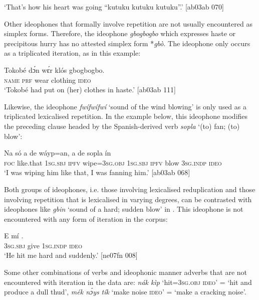 \glt ‘That’s how his heart was going “kutuku kutuku kutuku”.’ [ab03ab 070]
\z

Other ideophones that formally involve repetition are not usually encountered as simplex forms. Therefore, the ideophone \textit{gbogbogbo} which expresses haste or precipitous hurry has no attested simplex form *\textit{gbò}. The ideophone only occurs as a triplicated iteration, as in this example: 


\ea%
    \label{ex:key:1620}
    \gll Tokobé  dɔ́n  wɛ́r    klós    gbogbogbo.\\
\textsc{name}  \textsc{prf}  wear  clothing  \textsc{ideo}\\

\glt ‘Tokobé had put on (her) clothes in haste.’ [ab03ab 111]
\z

Likewise, the ideophone \textit{fwífwífwí} ‘sound of the wind blowing’ is only used as a triplicated lexicalised repetition. In the example below, this ideophone modifies the preceding clause headed by the Spanish-derived verb \textit{sopla} ‘(to) fan; (to) blow’:


\ea%
    \label{ex:key:1621}
    \gll Na  só    a    de  wáyp=an,  a    de  sopla  ín    \\
\textsc{foc}  like.that  \textsc{1sg.sbj}  \textsc{ipfv}  wipe=\textsc{3sg.obj}  \textsc{1sg.sbj}  \textsc{ipfv}  blow  \textsc{3sg.indp}  \textsc{ideo}\\

\glt ‘I was wiping him like that, I was fanning him.’ [ab03ab 068]
\z

Both groups of ideophones, i.e. those involving lexicalised reduplication and those involving repetition that is lexicalised in varying degrees, can be contrasted with ideophones like \textit{gbin} ‘sound of a hard; sudden blow’ in . This ideophone is not encountered with any form of iteration in the corpus:

\ea%
    \label{ex:key:1622}
    \gll E      mí    .\\
\textsc{3sg.sbj}  give  \textsc{1sg.indp}  \textsc{ideo}\\

\glt ‘He hit me hard and suddenly.’ [ne07fn 008]
\z

Some other combinations of verbs and ideophonic manner adverbs that are not encountered with iteration in the data are: \textit{nák kìp} ‘hit=\textsc{3sg.obj} \textsc{ideo’} = ‘hit and produce a dull thud’, \textit{mék nɔ́ys} \textit{tík} ‘make noise \textsc{ideo}’ = ‘make a cracking noise’.


